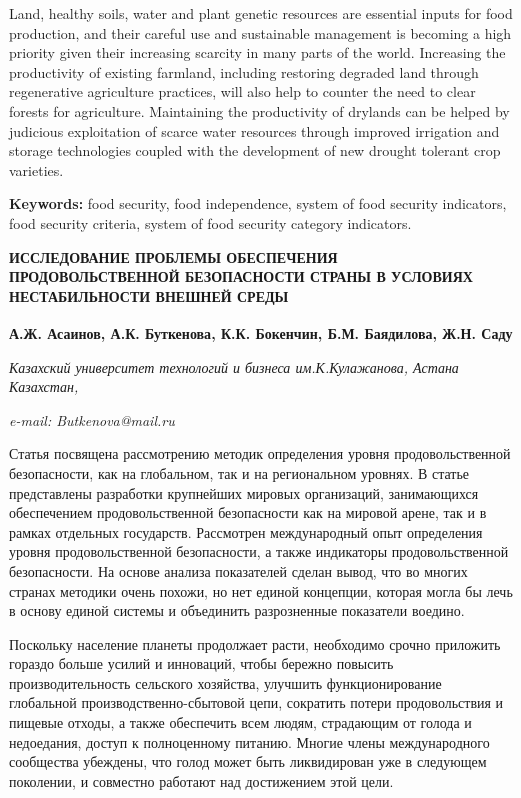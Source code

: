 Land, healthy soils, water and plant genetic resources are essential
inputs for food production, and their careful use and sustainable
management is becoming a high priority given their increasing scarcity
in many parts of the world. Increasing the productivity of existing
farmland, including restoring degraded land through regenerative
agriculture practices, will also help to counter the need to clear
forests for agriculture. Maintaining the productivity of drylands can be
helped by judicious exploitation of scarce water resources through
improved irrigation and storage technologies coupled with the
development of new drought tolerant crop varieties.

{\bfseries Keywords:} food security, food independence, system of food
security indicators, food security criteria, system of food security
category indicators.

\begin{articleheader}
{\bfseries ИССЛЕДОВАНИЕ ПРОБЛЕМЫ ОБЕСПЕЧЕНИЯ ПРОДОВОЛЬСТВЕННОЙ БЕЗОПАСНОСТИ СТРАНЫ В УСЛОВИЯХ НЕСТАБИЛЬНОСТИ ВНЕШНЕЙ СРЕДЫ}

{\bfseries
А.Ж. Асаинов,
А.К. Буткенова\textsuperscript{\envelope },
К.К. Бокенчин,
Б.М. Баядилова,
Ж.Н. Саду}
\end{articleheader}

\begin{affiliation}
\emph{Казахский университет технологий и бизнеса им.К.Кулажанова, Астана Казахстан,}

\emph{e-mail: Butkenova@mail.ru}
\end{affiliation}

Статья посвящена рассмотрению методик определения уровня
продовольственной безопасности, как на глобальном, так и на региональном
уровнях. В статье представлены разработки крупнейших мировых
организаций, занимающихся обеспечением продовольственной безопасности
как на мировой арене, так и в рамках отдельных государств. Рассмотрен
международный опыт определения уровня продовольственной безопасности, а
также индикаторы продовольственной безопасности. На основе анализа
показателей сделан вывод, что во многих странах методики очень похожи,
но нет единой концепции, которая могла бы лечь в основу единой системы и
объединить разрозненные показатели воедино.

Поскольку население планеты продолжает расти, необходимо срочно
приложить гораздо больше усилий и инноваций, чтобы бережно повысить
производительность сельского хозяйства, улучшить функционирование
глобальной производственно-сбытовой цепи, сократить потери
продовольствия и пищевые отходы, а также обеспечить всем людям,
страдающим от голода и недоедания, доступ к полноценному питанию. Многие
члены международного сообщества убеждены, что голод может быть
ликвидирован уже в следующем поколении, и совместно работают над
достижением этой цели.

